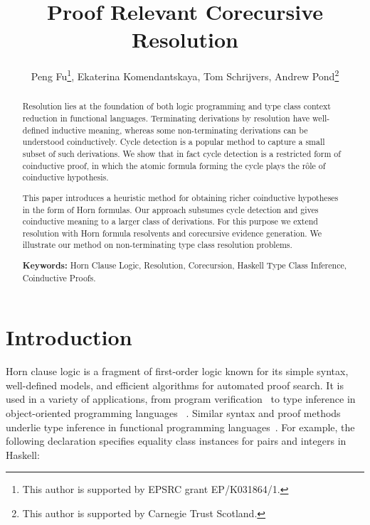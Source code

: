 \documentclass{llncs}
\begin{document}
\title{Proof Relevant Corecursive Resolution}
\author{Peng Fu\thanks{This author is supported by EPSRC grant EP/K031864/1.}, Ekaterina Komendantskaya, Tom Schrijvers, Andrew Pond\thanks{This author is supported by Carnegie Trust Scotland.}}




\maketitle
\begin{abstract}
Resolution lies at the foundation of both logic programming and type class
context reduction in functional languages.
Terminating derivations by resolution have well-defined inductive meaning,
whereas some non-terminating derivations can be understood coinductively. 
Cycle detection is a popular method to capture a small subset of such
derivations.  We show that in fact cycle detection is a restricted form of
coinductive proof, in which the atomic formula forming the cycle plays the
r\^{o}le of coinductive hypothesis.

This paper introduces a heuristic method for obtaining richer coinductive
hypotheses in the form of Horn formulas. Our approach subsumes cycle detection
and gives coinductive meaning to a larger class of derivations. For this
purpose we extend resolution with Horn formula resolvents and  corecursive
evidence generation. We illustrate our method on non-terminating type class
resolution problems.















\textbf{Keywords:} Horn Clause Logic, Resolution, Corecursion, Haskell Type Class Inference, Coinductive Proofs.



\end{abstract}


\section{Introduction}
\label{intro}

Horn clause logic is a fragment of first-order logic known for its simple syntax, well-defined models, and efficient algorithms for automated proof search.
It is used in a variety of applications, from program verification~\cite{BjornerGMR15} to type inference in object-oriented programming languages ~\cite{AnconaLagorio11}.
Similar syntax and proof methods underlie type inference in functional programming languages~\cite{wadler1989make,Lammel:2005}.
For example, the following declaration
specifies equality class instances for pairs and integers in Haskell:
\end{document}
